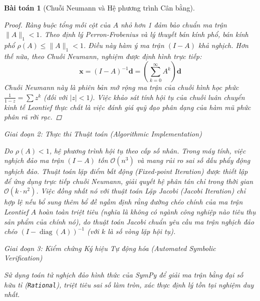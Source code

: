 \documentclass{article}
\newtheorem{baitoan}{Bài toán}
\begin{document}
\begin{baitoan}[Chuỗi Neumann và Hệ phương trình Cân bằng]
 \begin{proof}
 Ràng buộc tổng mỗi cột của $A$ nhỏ hơn 1 đảm bảo chuẩn ma trận $\|A\|_1 < 1$. Theo định lý Perron-Frobenius và lý thuyết bán kính phổ, bán kính phổ $\rho(A) \le \|A\|_1 < 1$. Điều này hàm ý ma trận $(I - A)$ khả nghịch.
 Hơn thế nữa, theo \emph{Chuỗi Neumann}, nghiệm được định hình trực tiếp:
 \begin{equation}
 \mathbf{x} = (I - A)^{-1} \mathbf{d} = \left( \sum_{k=0}^\infty A^k \right) \mathbf{d}
 \end{equation}
 Chuỗi Neumann này là phiên bản mở rộng ma trận của chuỗi hình học phức $\frac{1}{1-z} = \sum z^k$ (đối với $|z|<1$). Việc khảo sát tính hội tụ của chuỗi luân chuyển kinh tế Leontief thực chất là việc đánh giá quỹ đạo phân dạng của hàm mũ phức phân rã rời rạc.

  \end{proof}

\vspace{0.5em}\noindent\emph{Giai đoạn 2: Thực thi Thuật toán (Algorithmic Implementation)}
 
 Do $\rho(A) < 1$, hệ phương trình hội tụ theo cấp số nhân. Trong máy tính, việc nghịch đảo ma trận $(I-A)$ tốn $\mathcal{O}(n^3)$ và mang rủi ro sai số dấu phẩy động nghịch đảo. Thuật toán lặp điểm bất động (Fixed-point Iteration) được thiết lập để ứng dụng trực tiếp chuỗi Neumann, giải quyết hệ phân tán chỉ trong thời gian $\mathcal{O}(k \cdot n^2)$. Việc đồng nhất nó với thuật toán Lặp Jacobi (Jacobi Iteration) chỉ hợp lệ nếu bổ sung thêm bổ đề ngầm định rằng đường chéo chính của ma trận Leontief $A$ hoàn toàn triệt tiêu (nghĩa là không có ngành công nghiệp nào tiêu thụ sản phẩm của chính nó), do thuật toán Jacobi chuẩn yêu cầu ma trận nghịch đảo chéo $(I - \operatorname{diag}(A))^{-1}$ (với $k$ là số vòng lặp hội tụ).



\vspace{0.5em}\noindent\emph{Giai đoạn 3: Kiểm chứng Ký hiệu Tự động hóa (Automated Symbolic Verification)}
 
 Sử dụng toán tử nghịch đảo hình thức của \textsf{SymPy} để giải ma trận bằng đại số hữu tỉ (\texttt{Rational}), triệt tiêu sai số làm tròn, xác thực định lý tồn tại nghiệm duy nhất.




\end{baitoan}
\end{document}
